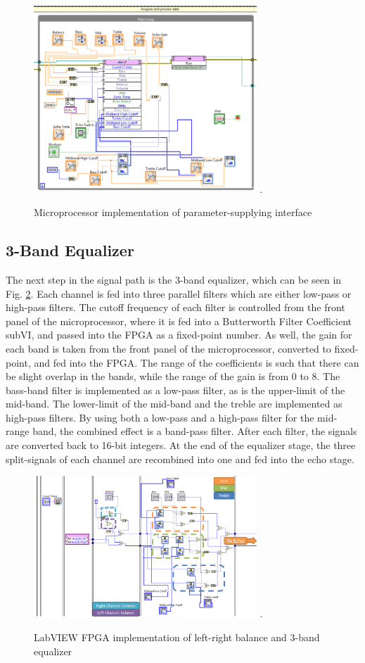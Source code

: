 \begin{figure}[!t]
\centering
\includegraphics[width=3.3in]{microcontroller.png}
\DeclareGraphicsExtensions.
\caption{Microprocessor implementation of parameter-supplying interface}
\label{fig_AEPUMicro}
\end{figure}

\subsection{3-Band Equalizer}
The next step in the signal path is the 3-band equalizer, which can be seen in Fig. \ref{fig_BEQ}. 
Each channel is fed into three parallel filters which are either low-pass or high-pass filters.
The cutoff frequency of each filter is controlled from the front panel of the microprocessor, where it is fed into a Butterworth Filter Coefficient subVI, and passed into the FPGA as a fixed-point number.
As well, the gain for each band is taken from the front panel of the microprocessor, converted to fixed-point, and fed into the FPGA.
The range of the coefficients is such that there can be slight overlap in the bands, while the range of the gain is from 0 to 8.
The bass-band filter is implemented as a low-pass filter, as is the upper-limit of the mid-band.
The lower-limit of the mid-band and the treble are implemented as high-pass filters.
By using both a low-pass and a high-pass filter for the mid-range band, the combined effect is a band-pass filter.
After each filter, the signals are converted back to 16-bit integers.
At the end of the equalizer stage, the three split-signals of each channel are recombined into one and fed into the echo stage.

\begin{figure}[!t]
\centering
\includegraphics[width=3.3in]{balanceandeq.png}
\DeclareGraphicsExtensions.
\caption{LabVIEW FPGA implementation of left-right balance and 3-band equalizer}
\label{fig_BEQ}
\end{figure}  

